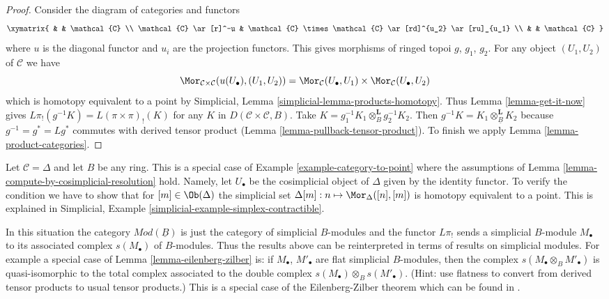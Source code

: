 \begin{proof}
Consider the diagram of categories and functors
$$
\xymatrix{
& & \mathcal{C} \\
\mathcal{C} \ar[r]^-u &
\mathcal{C} \times \mathcal{C} \ar[rd]^{u_2} \ar[ru]_{u_1} \\
& & \mathcal{C}
}
$$
where $u$ is the diagonal functor and $u_i$ are the projection functors.
This gives morphisms of ringed topoi $g$, $g_1$, $g_2$.
For any object $(U_1, U_2)$ of $\mathcal{C}$ we have
$$
\Mor_{\mathcal{C} \times \mathcal{C}}(u(U_\bullet), (U_1, U_2)) =
\Mor_\mathcal{C}(U_\bullet, U_1) \times \Mor_\mathcal{C}(U_\bullet, U_2)
$$
which is homotopy equivalent to a point by
Simplicial, Lemma \ref{simplicial-lemma-products-homotopy}.
Thus Lemma \ref{lemma-get-it-now} gives
$L\pi_!(g^{-1}K) = L(\pi \times \pi)_!(K)$ for any $K$ in
$D(\mathcal{C} \times \mathcal{C}, B)$.
Take $K = g_1^{-1}K_1 \otimes_B^\mathbf{L} g_2^{-1}K_2$.
Then $g^{-1}K = K_1 \otimes^\mathbf{L}_{\underline{B}} K_2$
because $g^{-1} = g^* = Lg^*$ commutes with derived tensor product
(Lemma \ref{lemma-pullback-tensor-product}).
To finish we apply Lemma \ref{lemma-product-categories}.
\end{proof}

\begin{remark}
\label{remark-simplicial-modules}
Let $\mathcal{C} = \Delta$ and let $B$ be any ring. This is a special
case of Example \ref{example-category-to-point} where the assumptions
of Lemma \ref{lemma-compute-by-cosimplicial-resolution} hold.
Namely, let $U_\bullet$ be the cosimplicial object of $\Delta$ given by
the identity functor. To verify the condition we have to show that for
$[m] \in \Ob(\Delta)$ the simplicial set
$\Delta[m] : n \mapsto \Mor_\Delta([n], [m])$ is homotopy equivalent
to a point. This is explained in
Simplicial, Example \ref{simplicial-example-simplex-contractible}.

\medskip\noindent
In this situation the category $\textit{Mod}(\underline{B})$
is just the category of simplicial $B$-modules and the
functor $L\pi_!$ sends a simplicial $B$-module $M_\bullet$ to its associated
complex $s(M_\bullet)$ of $B$-modules. Thus the results above can be
reinterpreted in terms of results on simplicial modules. For example
a special case of Lemma \ref{lemma-eilenberg-zilber} is:
if $M_\bullet$, $M'_\bullet$ are flat simplicial
$B$-modules, then the complex $s(M_\bullet \otimes_B M'_\bullet)$ is
quasi-isomorphic to the total complex associated to the double complex
$s(M_\bullet) \otimes_B s(M'_\bullet)$.
(Hint: use flatness to convert from derived tensor products to usual
tensor products.)
This is a special case of the Eilenberg-Zilber theorem
which can be found in \cite{Eilenberg-Zilber}.
\end{remark}

